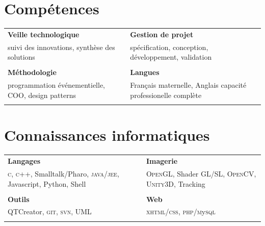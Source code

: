 \documentclass[9pt]{article}
\begin{document}
\hspace{-20pt}
\begin{minipage}[t]{0.47\textwidth}
	\vspace{-60pt} %
\section{Compétences}
	\begin{tabular}{p{}p{}}
		\textbf{\small Veille technologique} & \textbf{\small Gestion de projet} \\
		{\small suivi des innovations, synthèse des solutions} & 
		{\small spécification, conception, développement, validation} \\ & \\
	
		\textbf{\small Méthodologie} & \textbf{\small Langues} \\
		{\small programmation événementielle, COO, design patterns} & 
		{\small Fran\c cais maternelle, Anglais capacité professionelle complète} \\ & \\
	
	\end{tabular}
\end{minipage} %
\hspace{15pt}
\begin{minipage}{0.45\textwidth}

%
%

\section{Connaissances informatiques}
\begin{tabular}{p{}p{}}
	\textbf{\small Langages} & \textbf{\small Imagerie} \\
	{\small \textsc{c},  \textsc{c++}, Smalltalk/Pharo, \textsc{java/jee}, Javascript, Python, Shell} & 
	{\small \textsc{OpenGL}, Shader \textsc{GL/SL}, \textsc{OpenCV}, \textsc{Unity3D}, Tracking}\\ & \\

	\textbf{\small Outils} & \textbf{\small Web} \\
	{\small \textsc QTCreator, \textsc{git}, \textsc{svn}, {UML}} & 
	{\small \textsc{xhtml/css}, \textsc{php}/\textsc{m}y\textsc{sql}} \\ & 
	

\end{tabular}
\end{minipage} %
\end{document}

